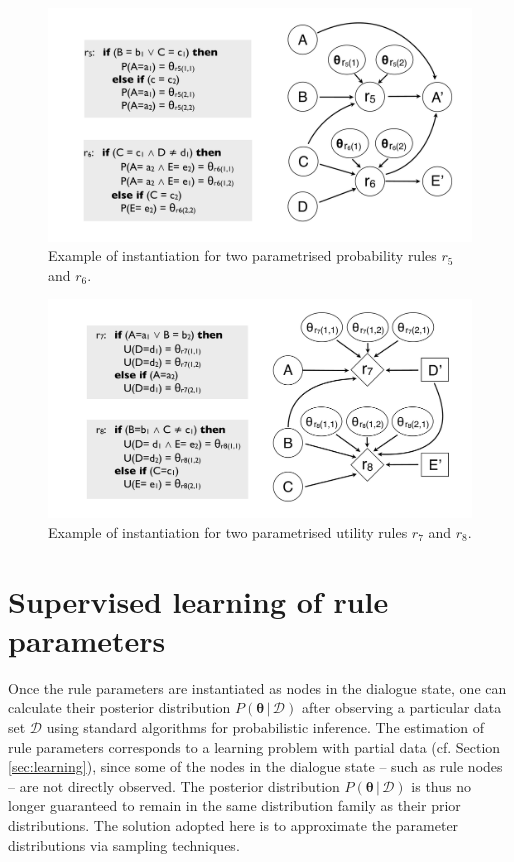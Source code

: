 \begin{figure}[h!]
\centering
\includegraphics[scale=0.25]{imgs/ruleinstantiation_params.pdf}
\caption{Example of instantiation for two parametrised probability rules $r_5$ and $r_6$.}
\label{fig:ruleinstantiation_params}
\end{figure}


\begin{figure}[h!]
\centering
\includegraphics[scale=0.25]{imgs/ruleinstantiation2_params.pdf}
\caption{Example of instantiation for two parametrised utility rules $r_7$ and $r_8$.}
\label{fig:ruleinstantiation_params2}
\end{figure}

\section{Supervised learning of rule parameters}
\label{sec:rule-supervised}

Once the rule parameters are instantiated as nodes in the dialogue state, one can calculate their posterior distribution $P(\boldsymbol\theta \, | \, \mathcal{D})$ after observing a particular data set $\mathcal{D}$ using standard algorithms for probabilistic inference. The estimation of rule parameters corresponds to a learning problem with partial data (cf. Section \ref{sec:learning}), since some of the nodes in the dialogue state  -- such as rule nodes -- are not directly observed. The posterior distribution $P(\boldsymbol\theta \, | \, \mathcal{D})$ is thus no longer guaranteed to remain in the same distribution family as their prior distributions.  The solution adopted here is to approximate the parameter distributions via sampling techniques.

